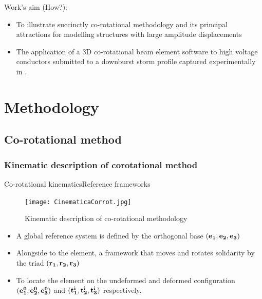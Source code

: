 \documentclass{beamer}
\begin{document}
 \begin{frame}
 
\begin{block}{Work's aim (How?):}
\begin{itemize}
\item To illustrate succinctly co-rotational methodology and its principal attractions for modelling structures with large amplitude displacements
\item The application of a 3D co-rotational beam element software to high voltage conductors submitted to a downburst storm profile captured experimentally in \cite{Stengel2017a}. 
 \end{itemize}
 
\end{block}
    \end{frame}

\section[Methodology]{Methodology}
\subsection[Co-rotational formulation]{Co-rotational method}
\subsubsection[Co-rotational kinematics]{Kinematic description of corotational method}

\begin{frame}{Co-rotational kinematics}{Reference frameworks}

\begin{figure}[H]
  \centering
    \texttt{[image: CinematicaCorrot.jpg]}
  \caption{Kinematic description of co-rotational methodology}
 \end{figure}

\begin{itemize}
  \item A global reference system is defined by the orthogonal base $(\bf{e_1},\bf{e_2},\bf{e_3})$
\item Alongside to the element, a framework that moves and rotates solidarity by the triad $(\bf{r_1},\bf{r_2},\bf{r_3})$
 \item To  locate the element on the undeformed and deformed configuration $(\bf{e_1^0},\bf{e_2^0},\bf{e_3^0})$ and $(\bf{t_1^i},\bf{t_2^i},\bf{t_3^i})$ respectively.
   \end{itemize}
\end{frame}
\end{document}
